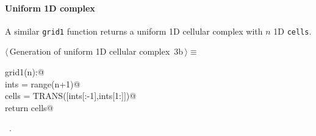 \documentclass[11pt,oneside]{article}	%
\begin{document}
\paragraph{Uniform 1D complex}
A similar \texttt{grid1} function returns a uniform 1D cellular complex with $n$ 1D \texttt{cells}.

\begin{flushleft} \small
\begin{minipage}{\linewidth} \label{scrap2}
\protect{}$\langle\,$Generation of uniform 1D cellular complex\nobreak\ {\footnotesize 3b}$\,\rangle\equiv$
\vspace{-1ex}
\begin{list}{}{} \item
\mbox{}\verb@def grid1(n):@\\
\mbox{}\verb@    ints = range(n+1)@\\
\mbox{}\verb@    cells = TRANS([ints[:-1],ints[1:]])@\\
\mbox{}\verb@    return cells@\\
\mbox{}\verb@@{\NWsep}
\end{list}
\vspace{-1ex}
\footnotesize\addtolength{\baselineskip}{-1ex}
\begin{list}{}{\setlength{\itemsep}{-\parsep}\setlength{\itemindent}{-\leftmargin}}
\item \NWtxtMacroRefIn\ .
\end{list}
\end{minipage}\\[4ex]
\end{flushleft}
\end{document}
